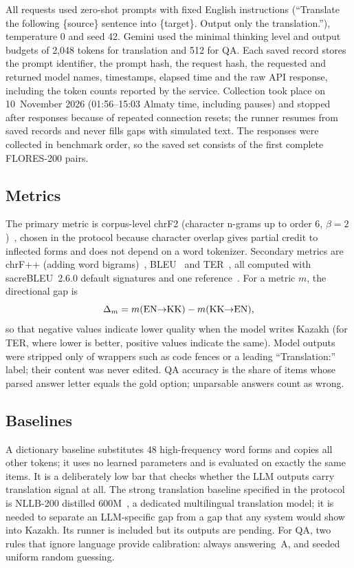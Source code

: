 All requests used zero-shot prompts with fixed English instructions (``Translate the following \{source\} sentence into \{target\}. Output only the translation.''), temperature 0 and seed 42. Gemini used the minimal thinking level and output budgets of 2{,}048 tokens for translation and 512 for QA. Each saved record stores the prompt identifier, the prompt hash, the request hash, the requested and returned model names, timestamps, elapsed time and the raw API response, including the token counts reported by the service. Collection took place on 10~November 2026 (01:56--15:03 Almaty time, including pauses) and stopped after \CovGemini{} responses because of repeated connection resets; the runner resumes from saved records and never fills gaps with simulated text. The responses were collected in benchmark order, so the saved set consists of the first \NPairs{} complete FLORES-200 pairs.

\subsection{Metrics}
The primary metric is corpus-level chrF2 (character n-grams up to order 6, $\beta=2$)~\cite{popovic2015chrf}, chosen in the protocol because character overlap gives partial credit to inflected forms and does not depend on a word tokenizer. Secondary metrics are chrF++ (adding word bigrams)~\cite{popovic2017chrfpp}, BLEU~\cite{papineni2002bleu} and TER~\cite{snover2006ter}, all computed with sacreBLEU~2.6.0 default signatures and one reference~\cite{post2018sacrebleu}. For a metric $m$, the directional gap is
\begin{equation}
\Delta_m = m(\text{EN$\rightarrow$KK}) - m(\text{KK$\rightarrow$EN}),
\label{eq:gap}
\end{equation}
so that negative values indicate lower quality when the model writes Kazakh (for TER, where lower is better, positive values indicate the same). Model outputs were stripped only of wrappers such as code fences or a leading ``Translation:'' label; their content was never edited. QA accuracy is the share of items whose parsed answer letter equals the gold option; unparsable answers count as wrong.

\subsection{Baselines}
A dictionary baseline substitutes 48 high-frequency word forms and copies all other tokens; it uses no learned parameters and is evaluated on exactly the same items. It is a deliberately low bar that checks whether the LLM outputs carry translation signal at all. The strong translation baseline specified in the protocol is NLLB-200 distilled 600M~\cite{nllb2022,nllb2024nature}, a dedicated multilingual translation model; it is needed to separate an LLM-specific gap from a gap that any system would show into Kazakh. Its runner is included but its outputs are pending. For QA, two rules that ignore language provide calibration: always answering~A, and seeded uniform random guessing.

